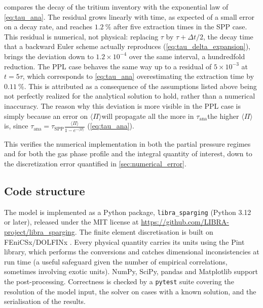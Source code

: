 \documentclass[a4paper,11pt,oneside]{report}
\newcommand{\Tana}{\ensuremath{\tau_\mathrm{ana}}}
\newcommand{\PI}{\ensuremath{\langle \Pi \rangle}}
\newcounter{assumption}[chapter]
\begin{document}
 compares the decay of the tritium inventory with the exponential law of \cref{eq:tau_ana}. The residual grows linearly with time, as expected of a small error on a decay rate, and reaches $1.2\ \%$ after five extraction times in the SPP case. This residual is numerical, not physical: replacing $\tau$ by $\tau+\Delta t/2$, the decay time that a backward Euler scheme actually reproduces (\cref{eq:tau_delta_expansion}), brings the deviation down to $1.2\times10^{-4}$ over the same interval, a hundredfold reduction. The PPL case behaves the same way up to a residual of $5\times10^{-3}$ at $t=5\tau$, which corresponds to \cref{eq:tau_ana} overestimating the extraction time by $0.11\ \%$. This is attributed as a consequence of the assumptions listed above being not perfectly realized for the analytical solution to hold, rather than a numerical inaccuracy. The reason why this deviation is more visible in the PPL case is simply because an error on \PI will propagate all the more in \Tana the higher \PI is, since $\Tana=\tau_\mathrm{SPP}\frac{\PI}{1-e^{-\PI}}$ (\cref{eq:tau_ana}).

This verifies the numerical implementation in both the partial pressure regimes and for both the gas phase profile and the integral quantity of interest, down to the discretization error quantified in \cref{sec:numerical_error}.


\subsection{Code structure}

The model is implemented as a Python package, \verb|libra_sparging| (Python 3.12 or later), released under the MIT license at \url{https://github.com/LIBRA-project/libra_sparging}\textcite{noauthor_libra-projectlibra_sparging_nodate}. The finite element discretisation is built on FEniCSx/DOLFINx \cite{Baratta_DOLFINx_the_next_2025}. Every physical quantity carries its units using the Pint library, which performs the conversions and catches dimensional inconsistencies at run time (a useful safeguard given the number of empirical correlations, sometimes involving exotic units). NumPy, SciPy, pandas and Matplotlib support the post-processing. Correctness is checked by a \verb|pytest| suite covering the resolution of the model input, the solver on cases with a known solution, and the
serialisation of the results.
\end{document}
